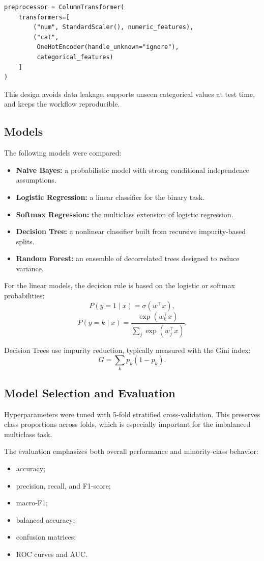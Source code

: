 \documentclass[12pt,a4paper]{article}
\begin{document}
\begin{verbatim}
preprocessor = ColumnTransformer(
    transformers=[
        ("num", StandardScaler(), numeric_features),
        ("cat",
         OneHotEncoder(handle_unknown="ignore"),
         categorical_features)
    ]
)
\end{verbatim}

This design avoids data leakage, supports unseen categorical values at test time, and keeps the workflow reproducible.

\subsection{Models}

The following models were compared:
\begin{itemize}
    \item \textbf{Naive Bayes:} a probabilistic model with strong conditional independence assumptions.
    \item \textbf{Logistic Regression:} a linear classifier for the binary task.
    \item \textbf{Softmax Regression:} the multiclass extension of logistic regression.
    \item \textbf{Decision Tree:} a nonlinear classifier built from recursive impurity-based splits.
    \item \textbf{Random Forest:} an ensemble of decorrelated trees designed to reduce variance.
\end{itemize}

For the linear models, the decision rule is based on the logistic or softmax probabilities:
\[
P(y = 1 \mid x) = \sigma(w^\top x),
\]
\[
P(y = k \mid x) = \frac{\exp(w_k^\top x)}{\sum_j \exp(w_j^\top x)}.
\]

Decision Trees use impurity reduction, typically measured with the Gini index:
\[
G = \sum_k p_k (1 - p_k).
\]

\subsection{Model Selection and Evaluation}

Hyperparameters were tuned with 5-fold stratified cross-validation. This preserves class proportions across folds, which is especially important for the imbalanced multiclass task.

The evaluation emphasizes both overall performance and minority-class behavior:
\begin{itemize}
    \item accuracy;
    \item precision, recall, and F1-score;
    \item macro-F1;
    \item balanced accuracy;
    \item confusion matrices;
    \item ROC curves and AUC.
\end{itemize}
\end{document}
